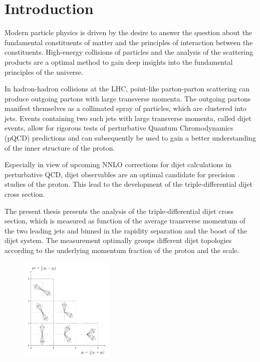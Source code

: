 
\chapter{Introduction}

Modern particle physics is driven by the desire to answer the question about the
fundamental constituents of matter and the principles of interaction between the
constituents. High-energy collisions of particles and the analysis of the
scattering products are a optimal method to gain deep insights into the
fundamental principles of the universe. 

In hadron-hadron collisions at the LHC, point-like parton-parton scattering can
produce outgoing partons with large transverse momenta. The outgoing partons
manifest themselves as a collimated spray of particles, which are clustered into
jets. Events containing two such jets with large transverse momenta, called
dijet events, allow for rigorous tests of perturbative Quantum Chromodynamics
(pQCD) predictions and can subsequently be used to gain a better understanding
of the inner structure of the proton. 

Especially in view of upcoming NNLO corrections for dijet calculations in
perturbative QCD, dijet observables are an optimal candidate for precision
studies of the proton. This lead to the development of the triple-differential
dijet cross section. 

The present thesis presents the analysis of the triple-differential dijet cross
section, which is measured as function of the average transverse momentum of the
two leading jets and binned in the rapidity separation and the boost of the
dijet system. The measurement optimally groups different dijet topologies
according to the underlying momentum fraction of the proton and the scale.


\begin{figure}[h!]
    \centering
    \includegraphics[width=0.4\textwidth]{figures/measurement/ybys.pdf}
\end{figure}

